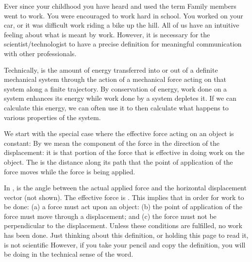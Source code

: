 %
{
%
Ever since your childhood you have heard and used the term 
Family members went to work.
You were encouraged to work hard in school.
You worked on your car, or it was difficult work riding a bike up the hill.
All of us have an intuitive feeling about what is meant by work.
However, it is necessary for the scientist/technologist to have a precise
definition for meaningful communication with other professionals.

Technically,  is the amount of energy transferred into or out
of a definite mechanical system through the action of a mechanical force acting
on that system along a finite trajectory.
By conservation of energy, work done on a system enhances its energy while
work done by a system depletes it.
If we can calculate this energy, we can often use it to then calculate
what happens to various properties of the system.

We start with the special case where the effective force acting on an object is
constant:
%
%
By  we mean
the component of the force in the direction of
the displacement: it is that portion of the force that is effective in doing
work on the object.
The  is the distance along its path that the point of
application of the force moves while the force is being applied.

In , \m{\theta} is the angle between the actual applied force 
and the horizontal displacement vector  (not shown).
The effective force is .
This implies that in order for work to be done: (a) a force must
act upon an object: (b) the point of application of the force must move through
a displacement; and (c) the force must not be perpendicular to the displacement.
Unless these conditions are fulfilled, no  work has been done.
Just thinking about this definition, or holding this page to read it, is not
scientific 
However, if you take your pencil and copy the definition, you will be doing
 in the technical sense of the word.


}
